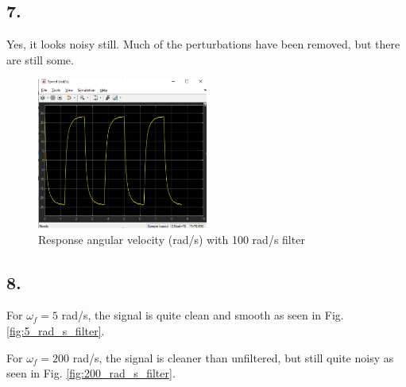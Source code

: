 \documentclass[letterpaper,12pt]{article}
\begin{document}
\subsection*{7.}
Yes, it looks noisy still. Much of the perturbations have been removed, but there are still some.
\begin{figure}[h]
    \centering
    \includegraphics[width=0.5\textwidth]{Figures/square_wave_velocity_100_rad_s_filter.png}
    \caption{Response angular velocity (rad/s) with 100 rad/s filter}
    \label{fig:100_rad_s_filter}
\end{figure}

\subsection*{8.}

For $\omega_f = 5$ rad/s, the signal is quite clean and smooth as seen in Fig. \ref{fig:5_rad_s_filter}.

For $\omega_f = 200$ rad/s, the signal is cleaner than unfiltered, but still quite noisy as seen in Fig. \ref{fig:200_rad_s_filter}.
\end{document}
